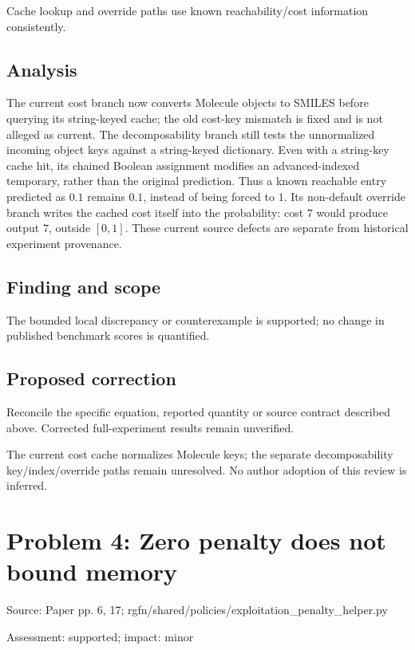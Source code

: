 \documentclass[11pt]{article}
\begin{document}
Cache lookup and override paths use known reachability/cost information consistently.

\subsection*{Analysis}

The current cost branch now converts Molecule objects to SMILES before querying its string-keyed cache; the old cost-key mismatch is fixed and is not alleged as current. The decomposability branch still tests the unnormalized incoming object keys against a string-keyed dictionary. Even with a string-key cache hit, its chained Boolean assignment modifies an advanced-indexed temporary, rather than the original prediction. Thus a known reachable entry predicted as \(0.1\) remains \(0.1\), instead of being forced to \(1\). Its non-default override branch writes the cached cost itself into the probability: cost \(7\) would produce output \(7\), outside \([0,1]\). These current source defects are separate from historical experiment provenance.

\subsection*{Finding and scope}

The bounded local discrepancy or counterexample is supported; no change in published benchmark scores is quantified.

\subsection*{Proposed correction}

Reconcile the specific equation, reported quantity or source contract described above. Corrected full-experiment results remain unverified.

The current cost cache normalizes Molecule keys; the separate decomposability key/index/override paths remain unresolved. No author adoption of this review is inferred.

\section*{Problem 4: Zero penalty does not bound memory}

Source: Paper pp. 6, 17; rgfn/shared/policies/exploitation\_penalty\_helper.py

Assessment: supported; impact: minor
\end{document}
